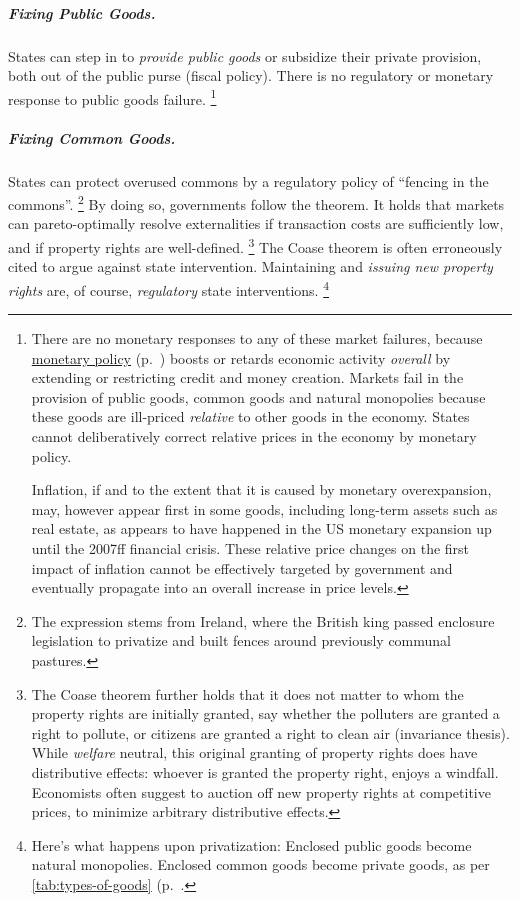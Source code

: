 \subparagraph{Fixing Public Goods.}
	\label{sec:public-good-response}
States can step in to \emph{provide public goods} or subsidize their private provision, both out of the public purse (fiscal policy).
There is no regulatory or monetary response to public goods failure.
\footnote{
	\label{fn:monetary-commons}
	There are no monetary responses to any of these market failures, because \hyperref[sec:monetary]{monetary policy} (p.~\pageref{sec:monetary}) boosts or retards economic activity \emph{overall} by extending or restricting credit and money creation.
	Markets fail in the provision of public goods, common goods and natural monopolies because these goods are ill-priced \emph{relative} to other goods in the economy.
	States cannot deliberatively correct relative prices in the economy by monetary policy.

	Inflation, if and to the extent that it is caused by monetary overexpansion, may, however appear first in some goods, including long-term assets such as real estate, as appears to have happened in the US monetary expansion up until the 2007ff financial crisis.
	These relative price changes on the first impact of inflation cannot be effectively targeted by government and eventually propagate into an overall increase in price levels.
}

\subparagraph{Fixing Common Goods.}
	\label{sec:common-good-response}
States can protect overused commons by a regulatory policy of ``fencing in the commons''.
\footnote{
	The expression stems from Ireland, where the British king passed enclosure legislation to privatize and built fences around previously communal pastures.
}
By doing so, governments follow the \cite{Coase1960} theorem.
It holds that markets can pareto-optimally resolve externalities if transaction costs are sufficiently low, and if property rights are well-defined.
\footnote{
	The Coase theorem further holds that it does not matter to whom the property rights are initially granted, say whether the polluters are granted a right to pollute, or citizens are granted a right to clean air (invariance thesis).
	While \emph{welfare} neutral, this original granting of property rights does have distributive effects:
	whoever is granted the property right, enjoys a windfall.
	Economists often suggest to auction off new property rights at competitive prices, to minimize arbitrary distributive effects.%
}
The Coase theorem is often erroneously cited to argue against state intervention.
Maintaining and \emph{issuing new property rights} are, of course, \emph{regulatory} state interventions.
\footnote{
	Here's what happens upon privatization:
	Enclosed public goods become natural monopolies.
	Enclosed common goods become private goods, as per \autoref{tab:types-of-goods} (p.~\pageref{tab:types-of-goods}.
}

